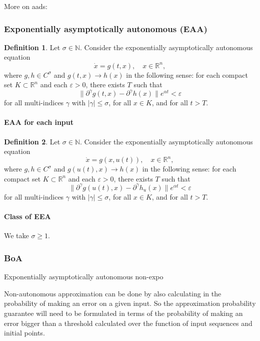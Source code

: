 \documentclass{article}
\theoremstyle{definition} \newtheorem{definition}{Definition}
\theoremstyle{remark} \newtheorem{remark}{Remark}
\newcounter{ct}
\begin{document}
More on aads: \citep{wieczorek2021compactification}

\subsubsection{Exponentially asymptotically autonomous (EAA)}
\begin{definition}\label{def:eaa}
Let \(\sigma \in \mathbb{N}\). Consider the exponentially asymptotically autonomous equation  
\[
\dot{x} = g(t,x), \quad x \in \mathbb{R}^n,
\]
where \( g, h \in C^\sigma \) and \( g(t,x) \to h(x) \) in the following sense: for each compact set \( K \subset \mathbb{R}^n \) and each \( \varepsilon > 0 \), there exists \( T \) such that  
\[
\|\partial^\gamma g(t,x) - \partial^\gamma h(x)\| e^{\alpha t} < \varepsilon
\]
for all multi-indices \( \gamma \) with \( |\gamma| \leq \sigma \), for all \( x \in K \), and for all \( t > T \).
\end{definition}

\paragraph{EAA for each input}\label{sec:eea_input}
\begin{definition}\label{def:eaa_input}
Let \(\sigma \in \mathbb{N}\). Consider the exponentially asymptotically autonomous equation  
\[
\dot{x} = g(x,u(t)), \quad x \in \mathbb{R}^n,
\]
where \( g, h \in C^\sigma \) and \( g(u(t),x) \to h(x) \) in the following sense: for each compact set \( K \subset \mathbb{R}^n \) and each \( \varepsilon > 0 \), there exists \( T \) such that  
\[
\|\partial^\gamma g(u(t),x) - \partial^\gamma h_u(x)\| e^{\alpha t} < \varepsilon
\]
for all multi-indices \( \gamma \) with \( |\gamma| \leq \sigma \), for all \( x \in K \), and for all \( t > T \).
\end{definition}

\paragraph{Class of EEA}
We take $\sigma\geq 1$.


\subsubsection{BoA}
Exponentially asymptotically autonomous \citep{giesl2011numerical}
non-expo \citep{giesl2012numerical}

Non-autonomous approximation can be done by also calculating in the probability of making an error on a given input.
So the approximation probability guarantee will need to be formulated in terms of the probability of making an error bigger than a threshold calculated over the function of input sequences and initial points.
\end{document}

